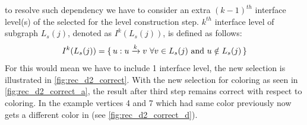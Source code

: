    \Inorder to resolve such dependency we have to consider an extra $(k-1)^{th}$ interface level(s) of the selected \subgraph for the level construction step. $k^{th}$ interface level of subgraph $L_s(j)$, denoted as $I^k(L_s(j))$, is defined as follows:
   \begin{equation*}
	   I^k(L_s(j)) = \set{u : u \xrightarrow{k} v \text{  } \forall v \in L_s(j) \text { and } u \notin L_s(j)}
   \end{equation*}
   For \DTWO this would mean we have to include 1 interface level, the new selection is illustrated in \cref{fig:rec_d2_correct}. With the new \subgraph selection for \DTWO coloring as seen in \cref{fig:rec_d2_correct_a}, the result after third step remains correct with respect to \DTWO coloring. In the example vertices 4 and 7 which had same color previously now gets a different color in (see \cref{fig:rec_d2_correct_d}). 
     
